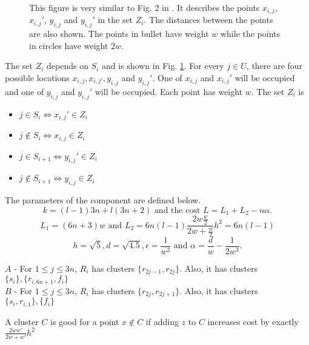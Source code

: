 \documentclass[orivec]{llncs}
\begin{document}
\begin{figure}
\center

\caption{This figure is very similar to Fig. 2 in \cite{vattani2009hardness}. It describes the points $x_{i,j}$, $x_{i,j}'$, $y_{i,j}$ and $y_{i,j}'$ in the set $Z_i$. The distances between the points are also shown. The points in bullet have weight $w$ while the points in circles have weight $2w$.}
\label{fig:ZFig}
\end{figure}

The set $Z_i$ depends on $S_i$ and is shown in Fig. \ref{fig:ZFig}.  For every $j\in U$, there are four possible locations $x_{i, j}, x_{i,j'}, y_{i,j}$ and $y_{i, j}'$. One of $x_{i,j}$ and $x_{i,j}'$ will be occupied and one of $y_{i,j}$ and $y_{i,j}'$ will be occupied. Each point has weight $w$. The set $Z_i$ is
\begin{itemize}[nolistsep,noitemsep]
\item $j \in S_i \iff x_{i,j}' \in Z_i$
\item $j \not\in S_i \iff x_{i,j} \in Z_i$
\item $j \in S_{i+1} \iff y_{i,j}' \in Z_i$
\item $j \not\in S_{i+1} \iff y_{i,j} \in Z_i$

\end{itemize}
The parameters of the component are defined below. $$k = (l-1)3n + l(3n+2) \text{ and the cost }L = L_1 + L_2 -n\alpha.$$
$$L_1 = (6n+3)w \text{ and } L_2 = 6n(l-1)\frac{2w\frac{w}{2}}{2w+\frac{w}{2}}h^2 = 6n(l-1)$$
$$h = \sqrt{5}, d = \sqrt{4.5}, \epsilon = \frac{1}{w^2} \text{ and } \alpha = \frac{d}{w}-\frac{1}{2w^3}.$$

\begin{definition}
\label{defn:abclusteringVattani}
\noindent $A$ - For $1 \le j \le 3n$, $R_i$ has clusters $\{r_{2j-1}, r_{2j}\}$. Also, it has clusters $\{s_i\}, \{r_{i, 6n+1}, f_i\}$\\
\noindent $B$ - For $1 \le j \le 3n$, $R_i$ has clusters $\{r_{2j}, r_{2j+1}\}$. Also, it has clusters $\{s_i, r_{i, 1}\}, \{f_i\}$
\end{definition}

\begin{definition}
\label{defn:goodPointVattani}
A cluster $C$ is good for a point $x \not\in C$ if adding $z$ to $C$ increases cost by exactly $\frac{2ww'}{2w+w'}h^2$ 
\end{definition}
\end{document}

